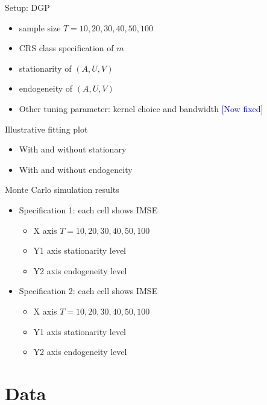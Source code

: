 \documentclass[aspectratio=169]{beamer}
\begin{document}
\begin{frame}{Setup: DGP}
\begin{itemize}
    \item sample size $T=10,20,30,40,50,100$
    \item CRS class specification of $m$
    \item stationarity of $(A,U,V)$
    \item endogeneity of $(A,U,V)$
    \item Other tuning parameter: kernel choice and bandwidth  \textcolor{blue}{[Now fixed]}
\end{itemize}
    
\end{frame}

\begin{frame}{Illustrative fitting plot}
\begin{itemize}
    \item With and without stationary
    \item With and without endogeneity
\end{itemize}
    
\end{frame}

\begin{frame}{Monte Carlo simulation results}
\begin{itemize}
    \item Specification 1: each cell shows IMSE
    \begin{itemize}
        \item X axis $T=10,20,30,40,50,100$ 
        \item Y1 axis stationarity level
        \item Y2 axis endogeneity level
    \end{itemize}
    \item Specification 2: each cell shows IMSE
    \begin{itemize}
        \item X axis $T=10,20,30,40,50,100$ 
        \item Y1 axis stationarity level
        \item Y2 axis endogeneity level
    \end{itemize}
    
\end{itemize}
    
\end{frame}


\section{Data}
\end{document}

